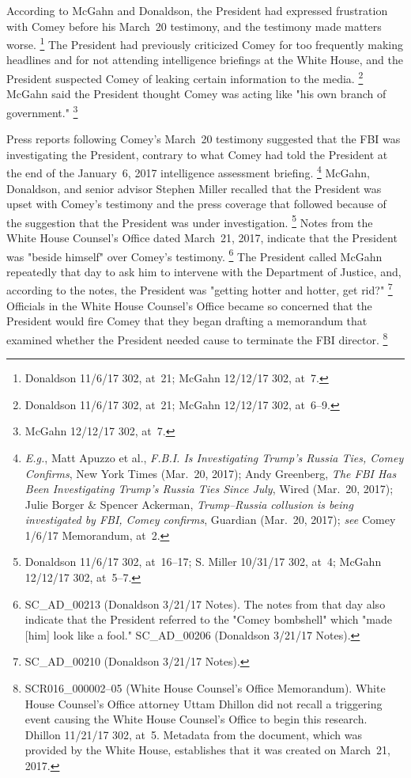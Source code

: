 According to McGahn and Donaldson, the President had expressed frustration with Comey before his March~20 testimony, and the testimony made matters worse.%
\footnote{Donaldson 11/6/17 302, at~21;
McGahn 12/12/17 302, at~7.}
The President had previously criticized Comey for too frequently making headlines and for not attending intelligence briefings at the White House, and the President suspected Comey of leaking certain information to the media.%
\footnote{Donaldson 11/6/17 302, at~21;
McGahn 12/12/17 302, at~6--9.}
McGahn said the President thought Comey was acting like "his own branch of government."%
\footnote{McGahn 12/12/17 302, at~7.}

Press reports following Comey's March~20 testimony suggested that the FBI was investigating the President, contrary to what Comey had told the President at the end of the January~6, 2017 intelligence assessment briefing.%
\footnote{\textit{E.g.}, Matt Apuzzo et al., \textit{F.B.I. Is Investigating Trump's Russia Ties, Comey Confirms}, New York Times (Mar.~20, 2017);
Andy Greenberg, \textit{The FBI Has Been Investigating Trump's Russia Ties Since July}, Wired (Mar.~20, 2017);
Julie Borger \& Spencer Ackerman, \textit{Trump--Russia collusion is being investigated by FBI, Comey confirms}, Guardian (Mar.~20, 2017);
\textit{see} Comey 1/6/17 Memorandum, at~2.}
McGahn, Donaldson, and senior advisor Stephen Miller recalled that the President was upset with Comey's testimony and the press coverage that followed because of the suggestion that the President was under investigation.%
\footnote{Donaldson 11/6/17 302, at~16--17;
S. Miller 10/31/17 302, at~4;
McGahn 12/12/17 302, at~5--7.}
Notes from the White House Counsel's Office dated March~21, 2017, indicate that the President was "beside himself" over Comey's testimony.%
\footnote{SC\_AD\_00213 (Donaldson 3/21/17 Notes).
The notes from that day also indicate that the President referred to the "Comey bombshell" which "made [him] look like a fool."
SC\_AD\_00206 (Donaldson 3/21/17 Notes).}
The President called McGahn repeatedly that day to ask him to intervene with the Department of Justice, and, according to the notes, the President was "getting hotter and hotter, get rid?"%
\footnote{SC\_AD\_00210 (Donaldson 3/21/17 Notes).}
Officials in the White House Counsel's Office became so concerned that the President would fire Comey that they began drafting a memorandum that examined whether the President needed cause to terminate the FBI director.%
\footnote{SCR016\_000002--05 (White House Counsel's Office Memorandum).
White House Counsel's Office attorney Uttam Dhillon did not recall a triggering event causing the White House Counsel's Office to begin this research.
Dhillon 11/21/17 302, at~5.
Metadata from the document, which was provided by the White House, establishes that it was created on March~21, 2017.}

